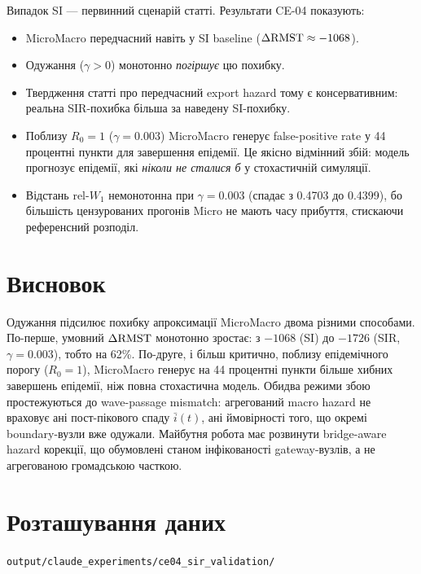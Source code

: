 \documentclass[11pt,a4paper]{article}
\begin{document}
Випадок SI --- первинний сценарій статті.  Результати CE-04 показують:
\begin{itemize}
  \item MicroMacro передчасний навіть у SI baseline ($\Delta\mathrm{RMST} \approx -1068$).
  \item Одужання ($\gamma > 0$) монотонно \emph{погіршує} цю похибку.
  \item Твердження статті про передчасний export hazard тому є консервативним:
        реальна SIR-похибка більша за наведену SI-похибку.
  \item Поблизу $R_0 = 1$ ($\gamma = 0.003$) MicroMacro генерує
        false-positive rate у 44 процентні пункти для завершення епідемії.
        Це якісно відмінний збій: модель прогнозує
        епідемії, які \emph{ніколи не сталися б} у стохастичній симуляції.
  \item Відстань rel-$W_1$ немонотонна при $\gamma = 0.003$
        (спадає з 0.4703 до 0.4399), бо більшість цензурованих прогонів Micro
        не мають часу прибуття, стискаючи референсний розподіл.
\end{itemize}

\section{Висновок}

Одужання підсилює похибку апроксимації MicroMacro двома різними способами.
По-перше, умовний $\Delta\mathrm{RMST}$ монотонно зростає: з $-1068$ (SI) до
$-1726$ (SIR, $\gamma=0.003$), тобто на 62\%.
По-друге, і більш критично, поблизу епідемічного порогу ($R_0=1$),
MicroMacro генерує на 44 процентні пункти більше хибних завершень епідемії,
ніж повна стохастична модель.
Обидва режими збою простежуються до wave-passage mismatch: агрегований
macro hazard не враховує ані пост-пікового спаду $\bar{i}(t)$,
ані ймовірності того, що окремі boundary-вузли вже одужали.
Майбутня робота має розвинути bridge-aware hazard корекції, що
обумовлені станом інфікованості gateway-вузлів, а не агрегованою громадською часткою.

\section*{Розташування даних}
\texttt{output/claude\_experiments/ce04\_sir\_validation/}
\end{document}
